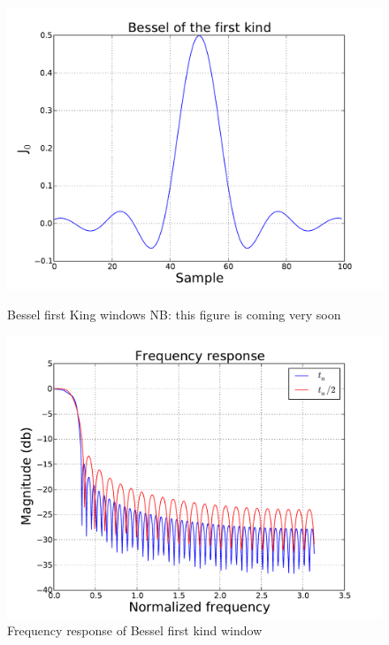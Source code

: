\documentclass[useAMS,usenatbib]{mn2e}
\begin{document}
\begin{figure}
  \centering
\begin{minipage}{0.36\linewidth}\includegraphics[width=1\textwidth]{./Figures/bessel.pdf}\caption{Bessel 
first King windows NB: this figure is coming very soon}\label{fig:bessel}\end{minipage}
\hspace{1cm}
\begin{minipage}{0.36\linewidth}\includegraphics[width=1\textwidth]{./Figures/freq_resp_bessel.pdf}\caption{Frequency 
response of Bessel first kind window}\label{fig:freq_resp_bessel} \end {minipage}
\end{figure}
\end{document}
